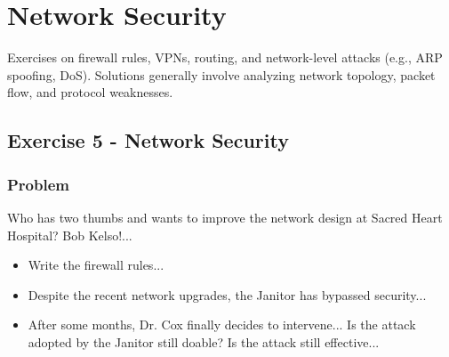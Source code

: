 \documentclass{article}
\begin{document}
\section{Network Security}
Exercises on firewall rules, VPNs, routing, and network-level attacks (e.g., ARP spoofing, DoS). Solutions generally involve analyzing network topology, packet flow, and protocol weaknesses.

\subsection{Exercise 5 - Network Security}
\subsubsection*{Problem}
Who has two thumbs and wants to improve the network design at Sacred Heart Hospital? Bob Kelso!... 
\begin{itemize}
    \item[\textbf{5.1}] Write the firewall rules... 
    \item[\textbf{5.2}] Despite the recent network upgrades, the Janitor has bypassed security... 
    \item[\textbf{5.3}] After some months, Dr. Cox finally decides to intervene... Is the attack adopted by the Janitor still doable? Is the attack still effective...
\end{itemize}
\end{document}
